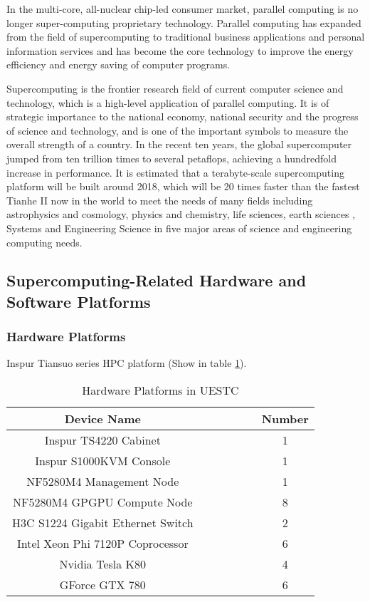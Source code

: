 \documentclass{mcmthesis}
\begin{document}
\par In the multi-core, all-nuclear chip-led consumer market, parallel computing is no longer super-computing proprietary technology. Parallel computing has expanded from the field of supercomputing to traditional business applications and personal information services and has become the core technology to improve the energy efficiency and energy saving of computer programs.

\par Supercomputing is the frontier research field of current computer science and technology, which is a high-level application of parallel computing. It is of strategic importance to the national economy, national security and the progress of science and technology, and is one of the important symbols to measure the overall strength of a country. In the recent ten years, the global supercomputer jumped from ten trillion times to several petaflops, achieving a hundredfold increase in performance. It is estimated that a terabyte-scale supercomputing platform will be built around 2018, which will be 20 times faster than the fastest Tianhe II now in the world to meet the needs of many fields including astrophysics and cosmology, physics and chemistry, life sciences, earth sciences , Systems and Engineering Science in five major areas of science and engineering computing needs.

\subsection{Supercomputing-Related Hardware and Software Platforms}

\subsubsection{Hardware Platforms}

\par Inspur Tiansuo series HPC platform (Show in table \ref{tab:Hardware Platforms in UESTC}).

\begin{table}[h]
\centering
\caption{Hardware Platforms in UESTC}\label{tab:Hardware Platforms in UESTC}
\begin{tabular}{ccc}
\toprule
Device Name &$\qquad \qquad$ & Number\\
\midrule
Inspur TS4220 Cabinet  &$\qquad \qquad$& 1 \\
Inspur S1000KVM Console &$\qquad \qquad$ & 1 \\
NF5280M4 Management Node &$\qquad \qquad$& 1 \\
NF5280M4 GPGPU Compute Node &$\qquad \qquad$& 8 \\
H3C S1224 Gigabit Ethernet Switch &$\qquad \qquad$& 2 \\
Intel Xeon Phi 7120P Coprocessor &$\qquad \qquad$& 6 \\
Nvidia Tesla K80 &$\qquad \qquad$& 4 \\
GForce GTX 780 &$\qquad \qquad$& 6 \\
\bottomrule
\end{tabular}
\end{table}
\end{document}
